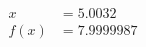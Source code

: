 \documentclass[preview]{standalone}
\begin{document}
\begin{align*}
x &= 5.0032\\f(x) &= 7.9999987
\end{align*}
\end{document}
